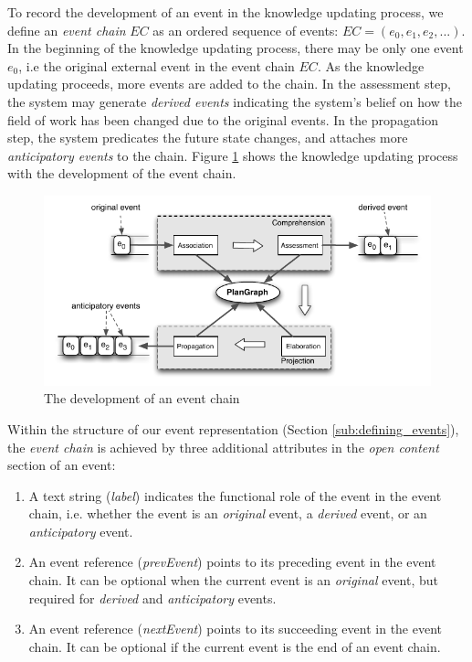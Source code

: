 To record the development of an event in the knowledge updating process, we define an \emph{event chain} $EC$ as an ordered sequence of events: $EC=(e_0, e_1, e_2, ...)$. In the beginning of the knowledge updating process, there may be only one event $e_0$, i.e the original external event in the event chain $EC$. As the knowledge updating proceeds, more events are added to the chain. In the assessment step, the system may generate \emph{derived events} indicating the system's belief on how the field of work has been changed due to the original events. In the propagation step, the system predicates the future state changes, and attaches more \emph{anticipatory events} to the chain. Figure \ref{fig:knowledge_updating} shows the knowledge updating process with the development of the event chain.
\begin{figure}[htbp] %
	\centering
	\includegraphics{knowledge_updating.pdf} 
	\caption{The development of an event chain}
	\label{fig:knowledge_updating}
\end{figure}

Within the structure of our event representation (Section \ref{sub:defining_events}), the \emph{event chain} is achieved by three additional attributes in the \emph{open content} section of an event: 

\begin{enumerate}
 	\item A text string (\emph{label}) indicates the functional role of the event in the event chain, i.e. whether the event is an \emph{original} event, a \emph{derived} event, or an \emph{anticipatory} event.
 	\item An event reference (\emph{prevEvent}) points to its preceding event in the event chain. It can be optional when the current event is an \emph{original} event, but required for \emph{derived} and \emph{anticipatory} events.
 	\item An event reference (\emph{nextEvent}) points to its succeeding event in the event chain. It can be optional if the current event is the end of an event chain.
 \end{enumerate} 

